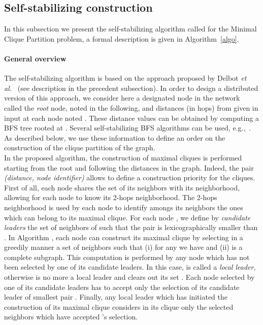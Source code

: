 \documentclass[11pt,letterpaper,onecolumn]{article}
\begin{document}
\subsection{Self-stabilizing construction}

In this subsection we present the self-stabilizing algorithm called  for the Minimal Clique Partition problem, a formal description is given in Algorithm~\ref{algo}.

\paragraph{General overview}

The self-stabilizing algorithm  is based on the approach proposed by Delbot \emph{et al.}~\cite{DelbotLP13} (see description in the precedent subsection). In order to design a distributed version of this approach, we consider here a designated node in the network called the \emph{root} node, noted  in the following, and distances (in hops) from  given in input at each node  noted . These distance values can be obtained by computing a BFS tree rooted at . Several self-stabilizing BFS algorithms can be used, e.g.,~\cite{HuangC92,DolevIM93,Johnen97,CournierRV11}. As described below, we use these information to define an order on the construction of the clique partition of the graph.\\
In the proposed algorithm, the construction of maximal cliques is performed starting from the root  and following the distances in the graph. Indeed, the pair \emph{(distance, node identifier)} allows to define a construction priority for the cliques. First of all, each node shares the set of its neighbors with its neighborhood, allowing for each node to know its 2-hops neighborhood. The 2-hops neighborhood is used by each node to identify amongs its neighbors the ones which can belong to its maximal clique. For each node , we define by \emph{candidate leaders} the set of neighbors  of  such that the pair  is lexicographically smaller than . In Algorithm , each node  can construct its maximal clique by selecting in a greedily manner a set of neighbors  such that (i) for any  we have  and (ii)  is a complete subgraph. This computation is performed by any node  which has not been selected by one of its candidate leaders. In this case,  is called a \emph{local leader}, otherwise  is no more a local leader and clears out its set . Each node selected by one of its candidate leaders has to accept only the selection of its candidate leader  of smallest pair . Finally, any local leader  which has initiated the construction of its maximal clique considers in its clique only the selected neighbors which have accepted 's selection.\\
\end{document}
